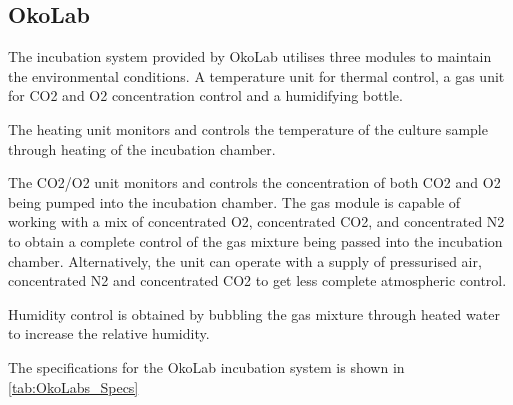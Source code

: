 \documentclass[class=report,11pt,crop=false]{standalone}
\begin{document}
\subsection{OkoLab}
The incubation system provided by OkoLab utilises three modules to maintain the environmental conditions. A temperature unit for thermal control, a gas unit for CO2 and O2 concentration control and a humidifying bottle. 

The heating unit monitors and controls the temperature of the culture sample through heating of the incubation chamber.

The CO2/O2 unit monitors and controls the concentration of both CO2 and O2 being pumped into the incubation chamber. The gas module is capable of working with a mix of concentrated O2, concentrated CO2, and concentrated N2 to obtain a complete control of the gas mixture being passed into the incubation chamber. Alternatively, the unit can operate with a supply of pressurised air, concentrated N2 and concentrated CO2 to get less complete atmospheric control.

Humidity control is obtained by bubbling the gas mixture through heated water to increase the relative humidity.

The specifications for the OkoLab incubation system is shown in \autoref{tab:OkoLabs_Specs}
\end{document}
